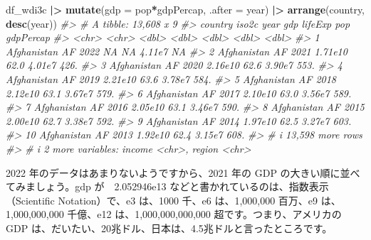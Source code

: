 \documentclass[
  xelatex, ja=standard]{bxjsbook}
\newenvironment{Shaded}{\begin{snugshade}}{\end{snugshade}}
\newcommand{\AttributeTok}[1]{\textcolor[rgb]{0.13,0.29,0.53}{#1}}
\newcommand{\CommentTok}[1]{\textcolor[rgb]{0.56,0.35,0.01}{\textit{#1}}}
\newcommand{\FunctionTok}[1]{\textcolor[rgb]{0.13,0.29,0.53}{\textbf{#1}}}
\newcommand{\NormalTok}[1]{#1}
\newcommand{\SpecialCharTok}[1]{\textcolor[rgb]{0.81,0.36,0.00}{\textbf{#1}}}
\theoremstyle{definition}
\theoremstyle{definition}
\theoremstyle{definition}
\theoremstyle{definition}
\theoremstyle{remark}
\begin{document}
\begin{Shaded}
\begin{Highlighting}[]
\NormalTok{df\_wdi3c }\SpecialCharTok{|\textgreater{}} \FunctionTok{mutate}\NormalTok{(}\AttributeTok{gdp =}\NormalTok{ pop}\SpecialCharTok{*}\NormalTok{gdpPercap, }\AttributeTok{.after =}\NormalTok{ year) }\SpecialCharTok{|\textgreater{}} 
  \FunctionTok{arrange}\NormalTok{(country, }\FunctionTok{desc}\NormalTok{(year))}
\CommentTok{\#\textgreater{} \# A tibble: 13,608 x 9}
\CommentTok{\#\textgreater{}    country     iso2c  year      gdp lifeExp    pop gdpPercap}
\CommentTok{\#\textgreater{}    \textless{}chr\textgreater{}       \textless{}chr\textgreater{} \textless{}dbl\textgreater{}    \textless{}dbl\textgreater{}   \textless{}dbl\textgreater{}  \textless{}dbl\textgreater{}     \textless{}dbl\textgreater{}}
\CommentTok{\#\textgreater{}  1 Afghanistan AF     2022 NA          NA   4.11e7       NA }
\CommentTok{\#\textgreater{}  2 Afghanistan AF     2021  1.71e10    62.0 4.01e7      426.}
\CommentTok{\#\textgreater{}  3 Afghanistan AF     2020  2.16e10    62.6 3.90e7      553.}
\CommentTok{\#\textgreater{}  4 Afghanistan AF     2019  2.21e10    63.6 3.78e7      584.}
\CommentTok{\#\textgreater{}  5 Afghanistan AF     2018  2.12e10    63.1 3.67e7      579.}
\CommentTok{\#\textgreater{}  6 Afghanistan AF     2017  2.10e10    63.0 3.56e7      589.}
\CommentTok{\#\textgreater{}  7 Afghanistan AF     2016  2.05e10    63.1 3.46e7      590.}
\CommentTok{\#\textgreater{}  8 Afghanistan AF     2015  2.00e10    62.7 3.38e7      592.}
\CommentTok{\#\textgreater{}  9 Afghanistan AF     2014  1.97e10    62.5 3.27e7      603.}
\CommentTok{\#\textgreater{} 10 Afghanistan AF     2013  1.92e10    62.4 3.15e7      608.}
\CommentTok{\#\textgreater{} \# i 13,598 more rows}
\CommentTok{\#\textgreater{} \# i 2 more variables: income \textless{}chr\textgreater{}, region \textless{}chr\textgreater{}}
\end{Highlighting}
\end{Shaded}

2022 年のデータはあまりないようですから、2021 年の GDP の大きい順に並べてみましょう。gdp が　2.052946e13 などと書かれているのは、指数表示（Scientific Notation）で、e3 は、1000 千、e6 は、1,000,000 百万、e9 は、1,000,000,000 千億、e12 は、1,000,000,000,000 超です。つまり、アメリカの GDP は、だいたい、20兆ドル、日本は、4.5兆ドルと言ったところです。
\end{document}
